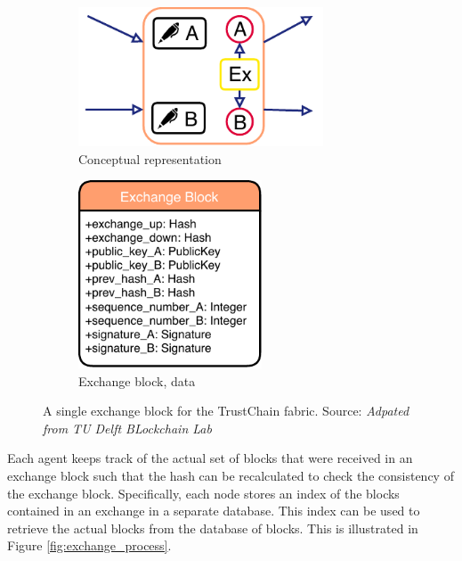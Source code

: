 \begin{figure}
    \centering
    \begin{subfigure}{0.49\textwidth}
        \centering
        \includegraphics[width=0.8\textwidth]{images/exchange_block.pdf}
        \caption{Conceptual representation}
        \label{fig:exchange_block}
    \end{subfigure}
    \begin{subfigure}{0.49\textwidth}
        \centering
        \includegraphics[width=0.6\textwidth]{images/exchange_block_data.pdf}
        \caption{Exchange block, data}
        \label{fig:exchange_block}
    \end{subfigure}
    \caption{A single exchange block for the TrustChain fabric. Source: \textit{Adpated from TU Delft BLockchain Lab}}
    \label{fig:exchange_block}
\end{figure}

Each agent keeps track of the actual set of blocks that were received in an exchange block such that 
the hash can be recalculated to check the consistency of the exchange block. Specifically, each 
node stores an index of the blocks contained in an exchange in a separate database. This index can be 
used to retrieve the actual blocks from the database of blocks. This is illustrated in Figure \ref{fig:exchange_process}.

